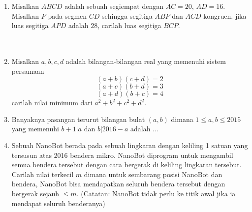 \documentclass{article}
\begin{document}
\begin{enumerate}[resume]
		
		
		\item Misalkan $ABCD$ adalah sebuah segiempat dengan $AC=20$, $AD=16$. Misalkan $P$ pada segmen $CD$ sehingga segitiga $ABP$ dan $ACD$ kongruen. jika luas segitiga $APD$ adalah $28$, carilah luas segitiga $BCP$.\\
		\\
		\\
		
		\item Misalkan $a, b, c, d$ adalah bilangan-bilangan real yang memenuhi sistem persamaan
		$$(a+b)(c+d)=2$$
		$$(a+c)(b+d)=3$$
		$$(a+d)(b+c)=4$$
		carilah nilai minimum dari $a^2+b^2+c^2+d^2$. 
		
		\item Banyaknya pasangan terurut bilangan bulat $(a, b)$ dimana $1 \le a, b \le 2015$ yang memenuhi $b + 1|a$ dan $b|2016 - a$ adalah ...
		
		\item Sebuah NanoBot berada pada sebuah lingkaran dengan keliling 1 satuan yang tersusun atas 2016 bendera mikro. NanoBot diprogram untuk mengambil semua bendera tersebut dengan cara bergerak di keliling lingkaran tersebut. Carilah nilai terkecil $m$ dimana untuk sembarang posisi NanoBot dan bendera, NanoBot bisa mendapatkan seluruh bendera tersebut dengan bergerak sejauh $\le m$. (Catatan: NanoBot tidak perlu ke titik awal jika ia mendapat seluruh benderanya)
		
\end{enumerate}
\end{document}
